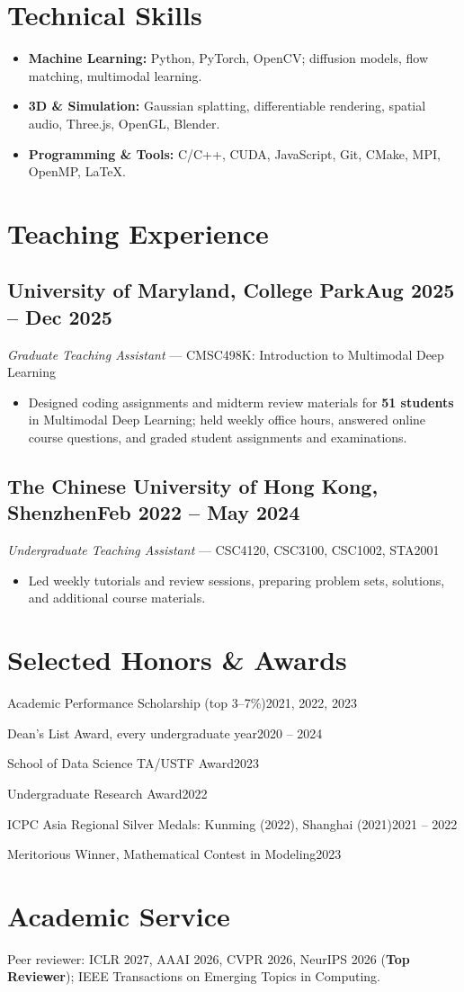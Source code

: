 \documentclass[11pt]{article}
\newcommand{\datedsubsection}[2]{}
\newcommand{\datedline}[2]{{\par #1\hfill #2\par}}
\renewcommand{\datedsubsection}[2]{%
  \subsection[#1]{#1\hfill{\normalfont\small #2}}}
\newcommand{\fullrow}[1]{#1}
\newcommand{\oneitem}[1]{\item #1}
\newcommand{\twoitem}[2]{\item #1 #2}
\begin{document}
\section{Technical Skills}
\begin{itemize}
\oneitem{\textbf{Machine Learning:} Python, PyTorch, OpenCV; diffusion models, flow matching, multimodal learning.}
\oneitem{\textbf{3D \& Simulation:} Gaussian splatting, differentiable rendering, spatial audio, Three.js, OpenGL, Blender.}
\oneitem{\textbf{Programming \& Tools:} C/C++, CUDA, JavaScript, Git, CMake, MPI, OpenMP, LaTeX.}
\end{itemize}

\section{Teaching Experience}
\datedsubsection{\textbf{University of Maryland, College Park}}{Aug 2025 -- Dec 2025}
\textit{Graduate Teaching Assistant} --- CMSC498K: Introduction to Multimodal Deep Learning
\begin{itemize}
\twoitem{Designed coding assignments and midterm review materials for \textbf{51 students} in Multimodal Deep Learning;}
  {held weekly office hours, answered online course questions, and graded student assignments and examinations.}
\end{itemize}

\datedsubsection{\textbf{The Chinese University of Hong Kong, Shenzhen}}{Feb 2022 -- May 2024}
\textit{Undergraduate Teaching Assistant} --- CSC4120, CSC3100, CSC1002, STA2001
\begin{itemize}
\oneitem{Led weekly tutorials and review sessions, preparing problem sets, solutions, and additional course materials.}
\end{itemize}

\section{Selected Honors \& Awards}
\datedline{Academic Performance Scholarship (top 3--7\%)}{2021, 2022, 2023}
\datedline{Dean's List Award, every undergraduate year}{2020 -- 2024}
\datedline{School of Data Science TA/USTF Award}{2023}
\datedline{Undergraduate Research Award}{2022}
\datedline{ICPC Asia Regional Silver Medals: Kunming (2022), Shanghai (2021)}{2021 -- 2022}
\datedline{Meritorious Winner, Mathematical Contest in Modeling}{2023}

\section{Academic Service}
\fullrow{Peer reviewer: ICLR 2027, AAAI 2026, CVPR 2026, NeurIPS 2026 (\textbf{Top Reviewer}); IEEE Transactions on Emerging Topics in Computing.}
\end{document}
